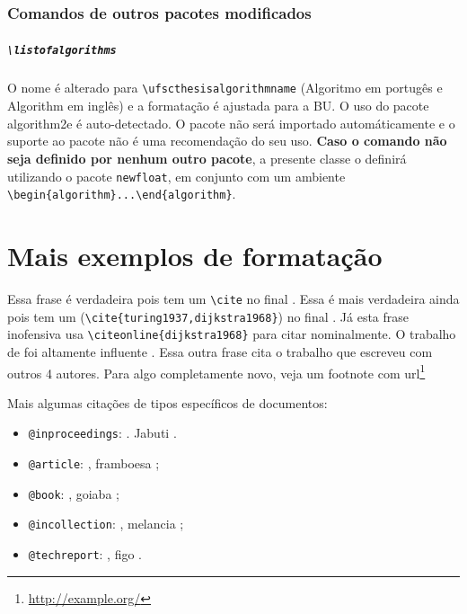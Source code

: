 \documentclass[embeddedlogo]{../ufsc-thesis-rn46-2019}
\newcommand{\lacmd}[1]{\texttt{\textbackslash{}#1}}
\begin{document}
\subsection{Comandos de outros pacotes modificados}

\paragraph*{\lacmd{listofalgorithms}} O nome é alterado para
\lacmd{ufscthesisalgorithmname} (Algoritmo em portugês e Algorithm em inglês) e
a formatação é ajustada para a BU. O uso do pacote algorithm2e é
auto-detectado. O pacote não será importado automáticamente e o suporte ao
pacote não é uma recomendação do seu uso. \textbf{Caso o comando não seja
  definido por nenhum outro pacote}, a presente classe o definirá utilizando o
pacote \texttt{newfloat}, em conjunto com um ambiente
\lacmd{begin\{algorithm\}...\lacmd{end\{algorithm\}}}.


\chapter{Mais exemplos de formatação}
\label{ch:ex}

Essa frase é verdadeira pois tem um \lacmd{cite} no final \cite{turing1937}. Essa
é mais verdadeira ainda pois tem um (\lacmd{cite\{turing1937,dijkstra1968\}}) no
final \cite{turing1937,dijkstra1968}. Já esta frase inofensiva usa
\lacmd{citeonline\{dijkstra1968\}} para citar 
nominalmente. O trabalho de  foi altamente influente
\cite{diffie1976}. Essa outra frase cita o trabalho que 
escreveu com outros 4 autores. Para algo completamente novo, veja um footnote
com url\footnote{\url{http://example.org/}}

Mais algumas citações de tipos específicos de documentos:
\begin{itemize}
\item \texttt{@inproceedings}: . Jabuti
  \cite{Ullman1989magic}.
\item \texttt{@article}: , framboesa \cite{Distefano2019};
\item \texttt{@book}: , goiaba \cite{Abiteboul1995};
\item \texttt{@incollection}: , melancia \cite{Forgy1989};
\item \texttt{@techreport}: , figo \cite{rdf11}.
\end{itemize}
\end{document}
